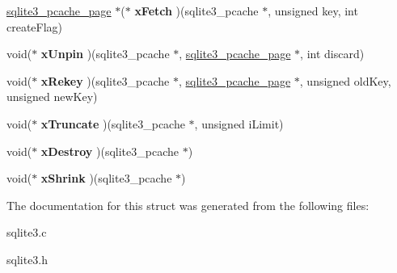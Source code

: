\begin{DoxyCompactItemize}
\item 
\hyperlink{structsqlite3__pcache__page}{sqlite3\+\_\+pcache\+\_\+page} $\ast$($\ast$ {\bfseries x\+Fetch} )(sqlite3\+\_\+pcache $\ast$, unsigned key, int create\+Flag)\hypertarget{structsqlite3__pcache__methods2_ac74dd2b35193a4309494311995da2d25}{}\label{structsqlite3__pcache__methods2_ac74dd2b35193a4309494311995da2d25}

\item 
void($\ast$ {\bfseries x\+Unpin} )(sqlite3\+\_\+pcache $\ast$, \hyperlink{structsqlite3__pcache__page}{sqlite3\+\_\+pcache\+\_\+page} $\ast$, int discard)\hypertarget{structsqlite3__pcache__methods2_ac94294551eda282f17b1ed2a110e1850}{}\label{structsqlite3__pcache__methods2_ac94294551eda282f17b1ed2a110e1850}

\item 
void($\ast$ {\bfseries x\+Rekey} )(sqlite3\+\_\+pcache $\ast$, \hyperlink{structsqlite3__pcache__page}{sqlite3\+\_\+pcache\+\_\+page} $\ast$, unsigned old\+Key, unsigned new\+Key)\hypertarget{structsqlite3__pcache__methods2_a28a22927b108182e22025bbe6ba1f68e}{}\label{structsqlite3__pcache__methods2_a28a22927b108182e22025bbe6ba1f68e}

\item 
void($\ast$ {\bfseries x\+Truncate} )(sqlite3\+\_\+pcache $\ast$, unsigned i\+Limit)\hypertarget{structsqlite3__pcache__methods2_a7c565709ab91dbe7feb5b82c684ba604}{}\label{structsqlite3__pcache__methods2_a7c565709ab91dbe7feb5b82c684ba604}

\item 
void($\ast$ {\bfseries x\+Destroy} )(sqlite3\+\_\+pcache $\ast$)\hypertarget{structsqlite3__pcache__methods2_a144d6e899889e80e00f93fb6c83359e2}{}\label{structsqlite3__pcache__methods2_a144d6e899889e80e00f93fb6c83359e2}

\item 
void($\ast$ {\bfseries x\+Shrink} )(sqlite3\+\_\+pcache $\ast$)\hypertarget{structsqlite3__pcache__methods2_af00c121e9c39b1df292711013c226ba5}{}\label{structsqlite3__pcache__methods2_af00c121e9c39b1df292711013c226ba5}

\end{DoxyCompactItemize}


The documentation for this struct was generated from the following files\+:\begin{DoxyCompactItemize}
\item 
sqlite3.\+c\item 
sqlite3.\+h\end{DoxyCompactItemize}
